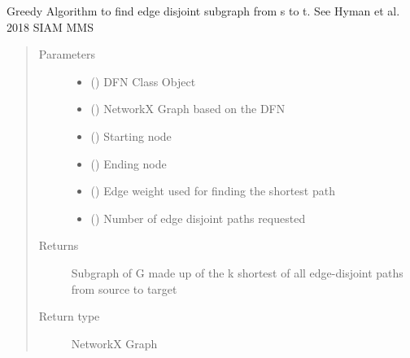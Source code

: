 \documentclass[letterpaper,10pt,english]{sphinxmanual}
\begin{document}
\begin{fulllineitems}
\label{\detokenize{pydfnworks:pydfnworks.dfnGraph.dfn2graph.greedy_edge_disjoint}}
Greedy Algorithm to find edge disjoint subgraph from s to t.
See Hyman et al. 2018 SIAM MMS
\begin{quote}\begin{description}
\item[{Parameters}] \leavevmode\begin{itemize}
\item {} 
 () \textendash{} DFN Class Object

\item {} 
 () \textendash{} NetworkX Graph based on the DFN

\item {} 
 () \textendash{} Starting node

\item {} 
 () \textendash{} Ending node

\item {} 
 () \textendash{} Edge weight used for finding the shortest path

\item {} 
 () \textendash{} Number of edge disjoint paths requested

\end{itemize}

\item[{Returns}] \leavevmode
{} \textendash{} Subgraph of G made up of the k shortest of all edge-disjoint paths from source to target

\item[{Return type}] \leavevmode
NetworkX Graph

\end{description}\end{quote}

\end{fulllineitems}
\end{document}
